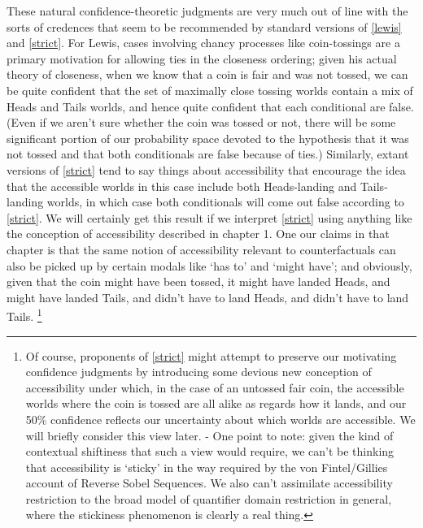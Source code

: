 \documentclass[If.tex]{subfiles}
\begin{document}
These natural confidence-theoretic judgments are very much out of line with the sorts of credences that seem to be recommended by standard versions of \ref{lewis} and \ref{strict}. For Lewis, cases involving chancy processes like coin-tossings are a primary motivation for allowing ties in the closeness ordering; given his actual theory of closeness, when we know that a coin is fair and was not tossed, we can be quite confident that the set of maximally close tossing worlds contain a mix of Heads and Tails worlds, and hence quite confident that each conditional are false. (Even if we aren't sure whether the coin was tossed or not, there will be some significant portion of our probability space devoted to the hypothesis that it was not tossed and that both conditionals are false because of ties.) Similarly, extant versions of \ref{strict} tend to say things about accessibility that encourage the idea that the accessible worlds in this case include both Heads-landing and Tails-landing worlds, in which case both conditionals will come out false according to \ref{strict}. We will certainly get this result if we interpret \ref{strict} using anything like the conception of accessibility described in chapter 1. One our claims in that chapter is that the same notion of accessibility relevant to counterfactuals can also be picked up by certain modals like ‘has to’ and ‘might have’; and obviously, given that the coin might have been tossed, it might have landed Heads, and might have landed Tails, and didn't have to land Heads, and didn't have to land Tails.%
\footnote{Of course, proponents of \ref{strict} might attempt to preserve our motivating confidence judgments by introducing some devious new conception of accessibility under which, in the case of an untossed fair coin, the accessible worlds where the coin is tossed are all alike as regards how it lands, and our 50\% confidence reflects our uncertainty about which worlds are accessible. We will briefly consider this view later. - One point to note: given the kind of contextual shiftiness that such a view would require, we can't be thinking that accessibility is ‘sticky’ in the way required by the von Fintel/Gillies account of Reverse Sobel Sequences. We also can't assimilate accessibility restriction to the broad model of quantifier domain restriction in general, where the stickiness phenomenon is clearly a real thing.}
\end{document}
